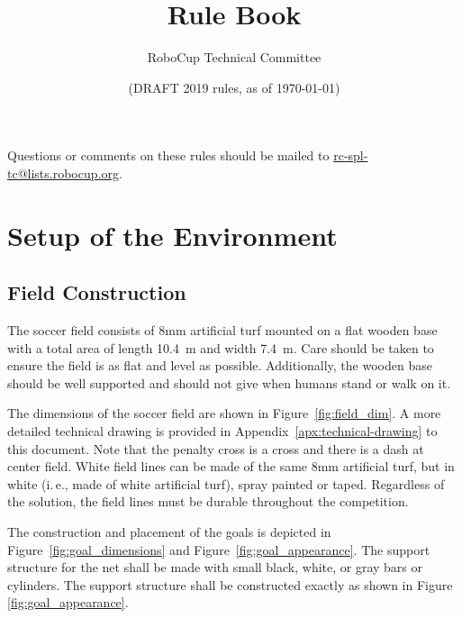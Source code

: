 \documentclass[12pt]{article}
\title{\leaguename Rule Book}
\author{RoboCup Technical Committee}
\date{(DRAFT 2019 rules, as of \today)}
\newcommand{\ie}{\mbox{i.\,e.}\xspace}
\newcommand{\TotalWidth}{7.4~m\xspace}
\newcommand{\TotalLength}{10.4~m\xspace }
\begin{document}
\maketitle

\begin{center}
Questions or comments on these rules should be mailed to \url{rc-spl-tc@lists.robocup.org}.
\end{center}

\vfill

\tableofcontents
\setcounter{tocdepth}{3}

\thispagestyle{fancy}

\clearpage

\cfoot{\thepage}
\setcounter{page}{1}

\newpage

\section{Setup of the Environment}

\subsection{Field Construction}
\label{sec:field_dim}

The soccer field consists of 8mm artificial turf mounted on a flat wooden base with a total area of length \TotalLength and width \TotalWidth.  Care should be taken to ensure the field is as flat and level as possible.  Additionally, the wooden base should be well supported and should not give when humans stand or walk on it.

The dimensions of the soccer field are shown in Figure~\ref{fig:field_dim}.
A more detailed technical drawing is provided in Appendix~\ref{apx:technical-drawing} to this document.
Note that the penalty cross is a cross and there is a dash at center field. White field lines can be made of the same 8mm artificial turf, but in white (\ie, made of white artificial turf), spray painted or taped. Regardless of the solution, the field lines must be durable throughout the competition.

The construction and placement of the goals is depicted in Figure~\ref{fig:goal_dimensions} and Figure~\ref{fig:goal_appearance}. The support structure for the net shall be made with small black, white, or gray bars or cylinders.  The support structure shall be constructed exactly as shown in Figure \ref{fig:goal_appearance}.
\end{document}
